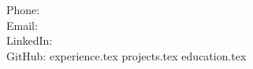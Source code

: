 \documentclass[letterpaper,10.5pt]{article}
\begin{document}
 {
    Phone:  \\ 
    Email:  \\
    LinkedIn:  \\
    GitHub: 
}
{experience.tex}
{projects.tex}
{education.tex}
\end{document}
